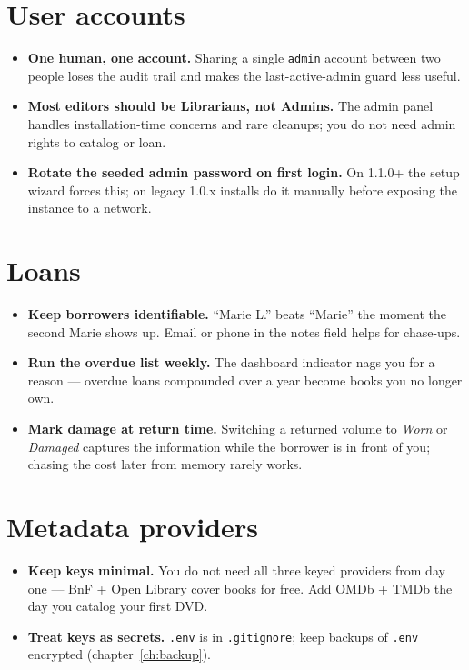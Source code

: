 \section{User accounts}

\begin{itemize}
  \item \textbf{One human, one account.} Sharing a single
        \texttt{admin} account between two people loses the audit
        trail and makes the last-active-admin guard less useful.
  \item \textbf{Most editors should be Librarians, not Admins.} The
        admin panel handles installation-time concerns and rare
        cleanups; you do not need admin rights to catalog or loan.
  \item \textbf{Rotate the seeded admin password on first login.}
        On 1.1.0+ the setup wizard forces this; on legacy 1.0.x
        installs do it manually before exposing the instance to a
        network.
\end{itemize}

\section{Loans}

\begin{itemize}
  \item \textbf{Keep borrowers identifiable.} ``Marie L.'' beats
        ``Marie'' the moment the second Marie shows up. Email or
        phone in the notes field helps for chase-ups.
  \item \textbf{Run the overdue list weekly.} The dashboard
        indicator nags you for a reason — overdue loans
        compounded over a year become books you no longer
        own.
  \item \textbf{Mark damage at return time.} Switching a returned
        volume to \emph{Worn} or \emph{Damaged} captures the
        information while the borrower is in front of you; chasing
        the cost later from memory rarely works.
\end{itemize}

\section{Metadata providers}

\begin{itemize}
  \item \textbf{Keep keys minimal.} You do not need all three
        keyed providers from day one — BnF + Open Library cover
        books for free. Add OMDb + TMDb the day you catalog
        your first DVD.
  \item \textbf{Treat keys as secrets.} \texttt{.env} is in
        \texttt{.gitignore}; keep backups of \texttt{.env}
        encrypted (chapter~\ref{ch:backup}).
\end{itemize}

